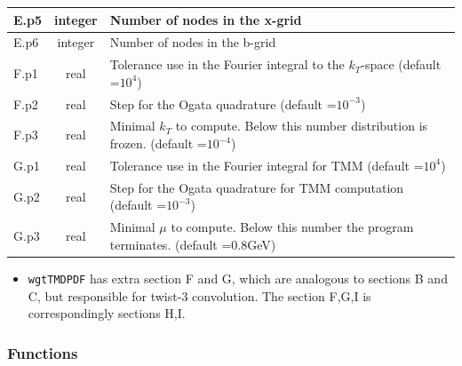 \documentclass[prd,nofootinbib,eqsecnum,final]{revtex4}
\renewcommand{\(}{\left(}
\renewcommand{\)}{\right)}
\renewcommand{\[}{\left[}
\renewcommand{\]}{\right]}
\begin{document}
\begin{center}
\begin{tabular}{||p{1.5cm}||c||p{12.5cm}||}
\\\hline
E.p5 & integer & Number of nodes in the x-grid
\\\hline
E.p6 & integer & Number of nodes in the b-grid
\\\hline\hline
F.p1 & real & Tolerance use in the Fourier integral to the $k_T$-space (default =$10^{4}$)
\\\hline
F.p2 & real & Step for the Ogata quadrature (default =$10^{-3}$)
\\\hline
F.p3 & real & Minimal $k_T$ to compute. Below this number distribution is frozen. (default =$10^{-4}$)
\\\hline\hline
G.p1 & real & Tolerance use in the Fourier integral for TMM (default =$10^{4}$)
\\\hline
G.p2 & real & Step for the Ogata quadrature for TMM computation (default =$10^{-3}$)
\\\hline
G.p3 & real & Minimal $\mu$ to compute. Below this number the program terminates. (default =$0.8$GeV)
\\\hline\hline
\end{tabular}
\end{center}
\begin{itemize}
\item \texttt{wgtTMDPDF} has extra section F and G, which are analogous to sections B and C, but responsible for twist-3 convolution. The section F,G,I is correspondingly sections H,I.
\end{itemize}

\subsubsection{Functions}
\end{document}
